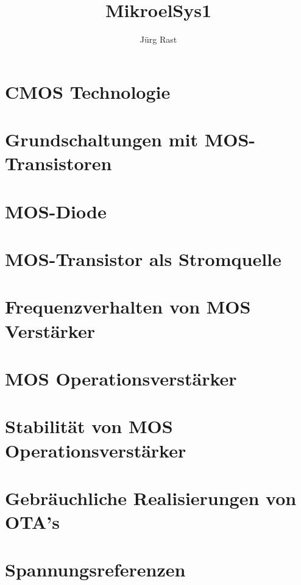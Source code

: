 \documentclass[titlepage=true]{scrartcl}
\title{MikroelSys1}
\author{Jürg Rast}
\begin{document}
\begin{titlepage}
	\thispagestyle{empty}
	\maketitle
\end{titlepage}

\tableofcontents
\newpage

\section{CMOS Technologie}





\section{Grundschaltungen mit MOS-Transistoren}

\section{MOS-Diode}

\section{MOS-Transistor als Stromquelle}





\section{Frequenzverhalten von MOS Verstärker}

\section{MOS Operationsverstärker}

\section{Stabilität von MOS Operationsverstärker}

\section{Gebräuchliche Realisierungen von OTA's}


\section{Spannungsreferenzen}
\end{document}
